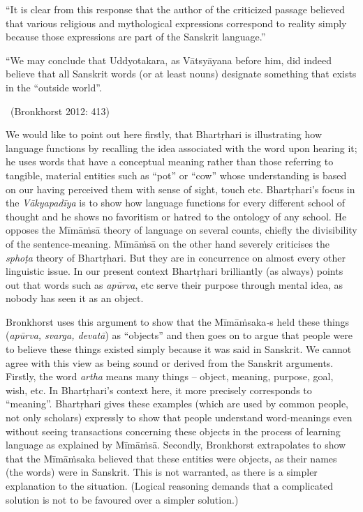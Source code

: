 \begin{myquote}
“It is clear from this response that the author of the criticized passage believed that various religious and mythological expressions correspond to reality simply because those expressions are part of the Sanskrit language.”
\end{myquote}

\begin{myquote}
“We may conclude that Uddyotakara, as Vātsyāyana before him, did indeed believe that all Sanskrit words (or at least nouns) designate something that exists in the “outside world”. 
\end{myquote}

\vspace{-.2cm}

\begin{myquote}

~\hfill (Bronkhorst 2012: 413)
\end{myquote}

We would like to point out here firstly, that Bhartṛhari is illustrating how language functions by recalling the idea associated with the word upon hearing it; he uses words that have a conceptual meaning rather than those referring to tangible, material entities such as “pot” or “cow” whose understanding is based on our having perceived them with sense of sight, touch etc. Bhartṛhari’s focus in the \textit{Vākyapadīya} is to show how language functions for every different school of thought and he shows no favoritism or hatred to the ontology of any school. He opposes the Mīmāṁsā theory of language on several counts, chiefly the divisibility of the sentence-meaning. Mīmāṁsā on the other hand severely criticises the \textit{sphoṭa} theory of Bhartṛhari. But they are in concurrence on almost every other linguistic issue. In our present context Bhartṛhari brilliantly (as always) points out that words such as \textit{apūrva}, etc serve their purpose through mental idea, as nobody has seen it as an object.

Bronkhorst uses this argument to show that the Mīmāṁsaka\textit{-}s held these things (\textit{apūrva, svarga, devatā}) as “objects” and then goes on to argue that people were to believe these things existed simply because it was said in Sanskrit. We cannot agree with this view as being sound or derived from the Sanskrit arguments. Firstly, the word \textit{artha} means many things -- object, meaning, purpose, goal, wish, etc. In Bhartṛhari’s context here, it more precisely corresponds to “meaning”. Bhartṛhari gives these examples (which are used by common people, not only scholars) expressly to show that people understand word-meanings even without seeing transactions concerning these objects in the process of learning language as explained by Mīmāṁsā. Secondly, Bronkhorst extrapolates to show that the Mīmāṁsaka believed that these entities were objects, as their names (the words) were in Sanskrit. This is not warranted, as there is a simpler explanation to the situation. (Logical reasoning demands that a complicated solution is not to be favoured over a simpler solution.)


